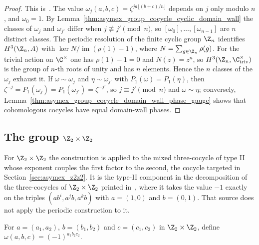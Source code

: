 \begin{proof}
    \leanok
    This is~\cite[``The classes of the cyclic cocycles'']{QICLean2026Blueprint}.
    The value $\omega_j(a,b,c)=\zeta^{ja\lfloor(b+c)/n\rfloor}$ depends on $j$
    only modulo $n$, and $\omega_0=1$. By
    Lemma~\ref{thm:asymex_group_cocycle_cyclic_domain_wall} the classes of
    $\omega_j$ and $\omega_{j'}$ differ when $j\not\equiv j'\pmod n$, so
    $[\omega_0],\ldots,[\omega_{n-1}]$ are $n$ distinct classes. The
    periodic resolution of the finite cyclic group $\Z_n$ identifies
    $H^3(\Z_n,A)$ with $\ker N/\operatorname{im}(\rho(1)-1)$, where
    $N=\sum_{g\in\Z_n}\rho(g)$. For the trivial action on $\C^\times$ one has
    $\rho(1)-1=0$ and $N(z)=z^n$, so $H^3(\Z_n,\C^\times_{\mathrm{triv}})$ is
    the group of $n$-th roots of unity and has $n$ elements. Hence the $n$
    classes of the $\omega_j$ exhaust it. If $\omega\sim\omega_j$ and
    $\eta\sim\omega_{j'}$ with $P_1(\omega)=P_1(\eta)$, then
    $\zeta^{-j}=P_1(\omega_j)=P_1(\omega_{j'})=\zeta^{-j'}$, so
    $j\equiv j'\pmod n$ and $\omega\sim\eta$; conversely,
    Lemma~\ref{thm:asymex_group_cocycle_domain_wall_phase_gauge} shows
    that cohomologous cocycles have equal domain-wall phases.
\end{proof}

\subsection{The group \texorpdfstring{$\Z_2\times\Z_2$}{Z2 x Z2}}

For $\Z_2\times\Z_2$ the construction is applied to the mixed three-cocycle
of type II whose exponent couples the first factor to the second, the
cocycle targeted in Section~\ref{sec:asymex_z2z2}. It is the type-II
component in the decomposition of the three-cocycles of $\Z_2\times\Z_2$
printed in~\cite[Section~6.1]{GarreRubio2023MPOSym}, where it takes the
value $-1$ exactly on the triples $(ab^i,a^jb,a^kb)$ with $a=(1,0)$ and
$b=(0,1)$. That source does not apply the periodic construction to it.

\begin{definition}
    \label{def:asymex_group_cocycle_klein}
    \leanok
    For $a=(a_1,a_2)$, $b=(b_1,b_2)$ and $c=(c_1,c_2)$ in $\Z_2\times\Z_2$,
    define $\omega(a,b,c)=(-1)^{a_1b_2c_2}$.
\end{definition}


